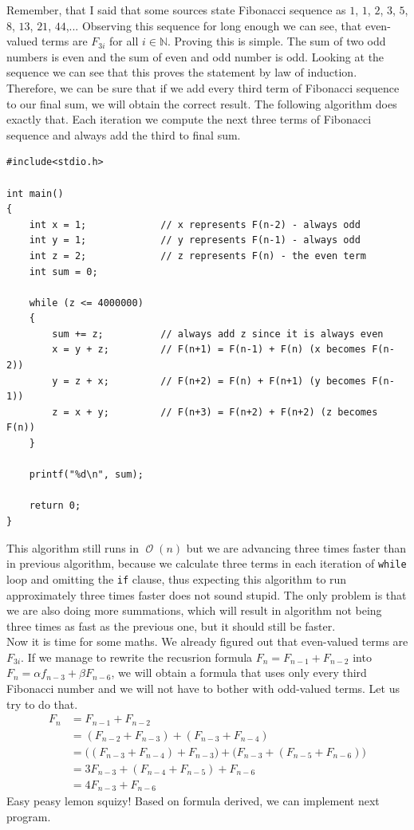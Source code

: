 \documentclass{book}
\DeclareMathOperator{\bigo}{\mathcal{O}}
\begin{document}
Remember, that I said that some sources state Fibonacci sequence as $1$, $1$, $2$, $3$, $5$, $8$, $13$, $21$, $44$,... Observing this sequence for long enough we can see, that even-valued terms are $F_{3i}$ for all $i \in \mathbb{N}$. Proving this is simple. The sum of two odd numbers is even and the sum of even and odd number is odd. Looking at the sequence we can see that this proves the statement by law of induction. Therefore, we can be sure that if we add every third term of Fibonacci sequence to our final sum, we will obtain the correct result. The following algorithm does exactly that. Each iteration we compute the next three terms of Fibonacci sequence and always add the third to final sum.

\begin{verbatim}
#include<stdio.h>

int main()
{
    int x = 1;             // x represents F(n-2) - always odd
    int y = 1;             // y represents F(n-1) - always odd
    int z = 2;             // z represents F(n) - the even term
    int sum = 0;
    
    while (z <= 4000000)
    {
        sum += z;          // always add z since it is always even
        x = y + z;         // F(n+1) = F(n-1) + F(n) (x becomes F(n-2))
        y = z + x;         // F(n+2) = F(n) + F(n+1) (y becomes F(n-1))
        z = x + y;         // F(n+3) = F(n+2) + F(n+2) (z becomes F(n))
    }
    
    printf("%d\n", sum);
    
    return 0;
}
\end{verbatim}

This algorithm still runs in $\bigo(n)$ but we are advancing three times faster than in previous algorithm, because we calculate three terms in each iteration of \texttt{while} loop and omitting the \texttt{if} clause, thus expecting this algorithm to run approximately three times faster does not sound stupid. The only problem is that we are also doing more summations, which will result in algorithm not being three times as fast as the previous one, but it should still be faster.\\

Now it is time for some maths. We already figured out that even-valued terms are $F_{3i}$. If we manage to rewrite the recusrion formula $F_n = F_{n-1} + F_{n-2}$ into $F_n = \alpha f_{n-3} + \beta F_{n-6}$, we will obtain a formula that uses only every third Fibonacci number and we will not have to bother with odd-valued terms. Let us try to do that.
\begin{align*}
F_n &= F_{n-1} + F_{n-2}\\
&= (F_{n-2} + F_{n-3}) + (F_{n-3} + F_{n-4})\\
&= \big((F_{n-3} + F_{n-4}) + F_{n-3}\big) + \big(F_{n-3} + (F_{n-5} + F_{n-6})\big)\\
&= 3F_{n-3} + (F_{n-4} + F_{n-5}) + F_{n-6}\\
&= 4F_{n-3} + F_{n-6}
\end{align*}
Easy peasy lemon squizy! Based on formula derived, we can implement next program.
\end{document}

